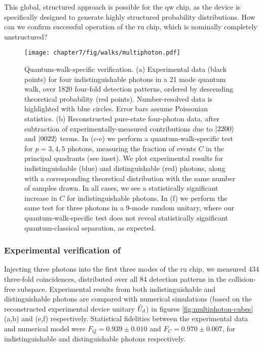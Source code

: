 This global, structured approach is possible for the \gls{qw} chip, as the device is specifically designed to generate highly structured probability distributions. How can we confirm successful operation of the \gls{ru} chip, which is nominally completely unstructured? 

\begin{figure}[t!]
\texttt{[image: chapter7/fig/walks/multiphoton.pdf]}
\caption[Quantum-walk-specific verification]{Quantum-walk-specific verification. (a) Experimental data (black points) for four indistinguishable photons in a 21 mode quantum walk, over 1820 four-fold detection patterns, ordered by descending theoretical probability (red points). Number-resolved data is highlighted with blue circles.
Error bars assume Poissonian statistics. (b) Reconstructed pure-state four-photon data, after subtraction of experimentally-measured contributions due to $\mbox{$ | 2200 \rangle $}$ and $\mbox{$ | 0022 \rangle $}$ terms.
In (c-e) we perform a quantum-walk-specific test for $p= 3,4,5 $ photons, measuring the fraction of events $C$ in the principal quadrants (see inset). We plot experimental results for indistinguishable (blue) and distinguishable (red) photons, along with a corresponding theoretical distribution with the same number of samples drawn. In all cases, we see a statistically significant increase in $C$ for indistinguishable photons. In (f) we perform the same test for three photons in a 9-mode random unitary, where our quantum-walk-specific test does not reveal statistically significant quantum-classical separation, as expected.
}
\label{fig:unitary_specific}
\end{figure}


\subsubsection{Experimental verification of \bosonsampling}
\label{sec:bosonsampling-verification}
Injecting three photons into the first three modes of the \gls{ru} chip, we measured 434 three-fold coincidences, distributed over all 84 detection patterns in the collision-free subspace. Experimental results from both indistinguishable and distinguishable photons are compared with numerical simulations (based on the reconstructed experimental device unitary $\hat{U}_d$) in figures \ref{fig:multiphoton-cubes} (a,b) and (e,f) respectively. Statistical fidelities between the experimental data and numerical model were $F_Q = 0.939\pm0.010$ and $F_C = 0.970 \pm 0.007$, for indistinguishable and distinguishable photons respectively.

